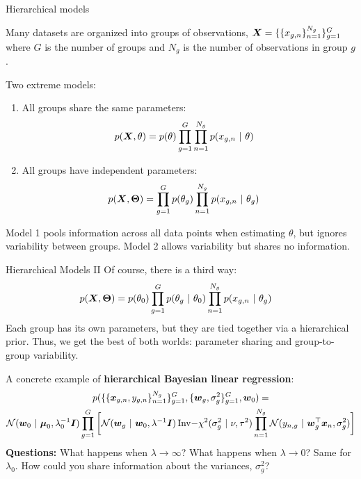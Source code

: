 \documentclass[aspectratio=169]{beamer}
\begin{document}
\begin{frame}{Hierarchical models}

Many datasets are organized into groups of observations, $\boldsymbol{X} = \{\{x_{g,n}\}_{n=1}^{N_g}\}_{g=1}^G$ where $G$ is the number of groups and $N_g$ is the number of observations in group $g$.

Two extreme models:
\begin{enumerate}
    \item All groups share the same parameters: 
    \begin{align}
        p(\boldsymbol{X}, \theta) &= p(\theta) \prod_{g=1}^G \prod_{n=1}^{N_g} p(x_{g,n} ~\vert~ \theta)
    \end{align}
    \item All groups have independent parameters:
    \begin{align}
        p(\boldsymbol{X}, \boldsymbol{\Theta}) &= \prod_{g=1}^G p(\theta_g) \prod_{n=1}^{N_g} p(x_{g,n} ~\vert~ \theta_g)
    \end{align}
\end{enumerate}
Model 1 pools information across all data points when estimating $\theta$, but ignores variability between groups. Model 2 allows variability but shares no information.

\end{frame}

\begin{frame}{Hierarchical Models II}
Of course, there is a third way:
\begin{align}
    p(\boldsymbol{X}, \boldsymbol{\Theta}) &= p(\theta_0) \prod_{g=1}^G p(\theta_g ~\vert~ \theta_0) \prod_{n=1}^{N_g} p(x_{g,n} ~\vert~ \theta_g)
\end{align}
Each group has its own parameters, but they are tied together via a hierarchical prior. Thus, we get the best of both worlds: parameter sharing and group-to-group variability.

A concrete example of \textbf{hierarchical Bayesian linear regression}:
\begin{multline}
    p(\{\{\boldsymbol{x}_{g,n}, y_{g,n}\}_{n=1}^{N_g}\}_{g=1}^G, \{\boldsymbol{w}_g, \sigma_g^2\}_{g=1}^G, \boldsymbol{w}_0)
    = \\
    \mathcal{N}(\boldsymbol{w}_0 ~\vert~ \boldsymbol{\mu}_0, \lambda_0^{-1} \boldsymbol{I}) \prod_{g=1}^G \bigg[ \mathcal{N}(\boldsymbol{w}_g ~\vert~ \boldsymbol{w}_0, \lambda^{-1} \boldsymbol{I})\,  \mathrm{Inv-}\chi^2(\sigma_g^2 ~\vert~ \nu, \tau^2) \prod_{n=1}^{N_g} \mathcal{N}(y_{n,g} ~\vert~ \boldsymbol{w}_g^\top \boldsymbol{x}_n, \sigma_g^2) \bigg]
\end{multline}
\textbf{Questions: } What happens when $\lambda \to \infty$? What happens when $\lambda \to 0$? Same for $\lambda_0$. How could you share information about the variances, $\sigma_g^2$?
\end{frame}
\end{document}
